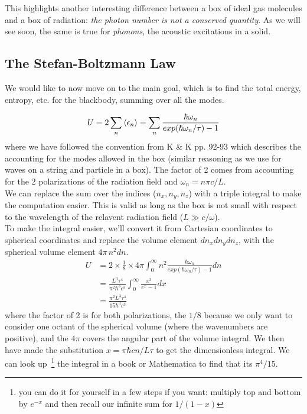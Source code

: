 This highlights another interesting difference between
a box of ideal gas molecules and a box of radiation: \emph{the photon number is
not a conserved quantity}. As we will see soon, the same is true for 
\textit{phonons}, the acoustic excitations in a solid.


\subsection{The Stefan-Boltzmann Law}
We would like to now move on to the main goal, which is to find the total energy,
entropy, etc. for the blackbody, summing over all the modes.

\begin{equation}
U = 2 \sum_n \Braket{\epsilon_n} = 
\sum_n \frac{\hbar \omega_n}{exp(\hbar \omega_n / \tau) - 1}
\end{equation}
where we have followed the convention from K \& K pp. 92-93 which describes
the accounting for the modes allowed in the box (similar reasoning as we use
for waves on a string and particle in a box). The factor of 2 comes from accounting
for the 2 polarizations of the radiation field and $\omega_n = n \pi c/L$.\\

We can replace the sum over the indices ($n_x, n_y, n_z$) with a triple integral
to make the computation easier. This is valid as long as the box is not small
with respect to the wavelength of the relavent radiation field ($L \gg c/\omega$).\\

To make the integral easier, we'll convert it from Cartesian coordinates to
spherical coordinates and replace the volume element $dn_x dn_y dn_z$, with
the spherical volume element $4 \pi\,n^2 dn$.
\begin{align}
U &= 2 \times \frac{1}{8} \times 4 \pi 
\int_{0}^{\infty} n^2 \frac{\hbar \omega_n}{exp(\hbar \omega_n / \tau) - 1} dn \\
  &= \frac{L^3 \tau^4}{\pi^2 \hbar^3 c^3} \int_{0}^{\infty} \frac{x^3}{e^x - 1} dx \\
  &= \frac{\pi^2 L^3 \tau^4}{15 \hbar^3 c^3}
\label{eq:BBenergy}
\end{align}
where the factor of 2 is for both polarizations, the $1/8$ because we only want to consider one octant of the spherical volume (where the wavenumbers are positive), and the $4 \pi$ covers the angular part of the volume integral. We then have made the substitution $x = \pi \hbar c n / L \tau$ to get the dimensionless 
integral. We can look up~\footnote{you can do it for yourself in a few steps if you want: multiply top and bottom by $e^{-x}$ and then recall our infinite sum for 
$1/(1-x)$} the integral in a book or Mathematica to find that its $\pi^4/15$.

